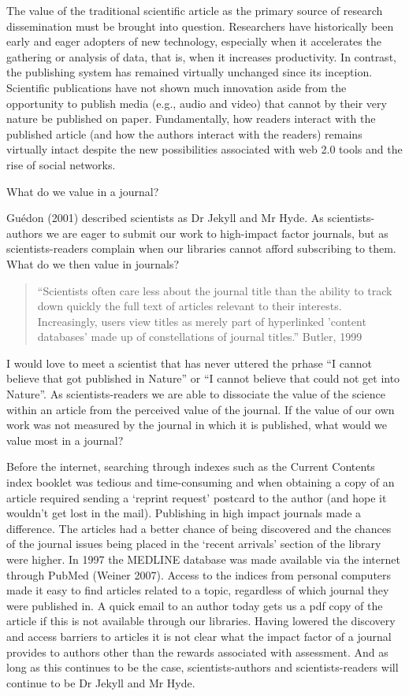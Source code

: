 \documentclass[final,authoryear,3p]{elsarticle-open-drafting}
\begin{document}
The value of the traditional scientific article as the primary source of research dissemination must be brought into question. Researchers have historically been early and eager adopters of new technology, especially when it accelerates the gathering or analysis of data, that is, when it increases productivity. In contrast, the publishing system has remained virtually unchanged since its inception. Scientific publications have not shown much innovation aside from the opportunity to publish media (e.g., audio and video) that cannot by their very nature be published on paper. Fundamentally, how readers interact with the published article (and how the authors interact with the readers) remains virtually intact despite the new possibilities associated with web 2.0 tools and the rise of social networks.

What do we value in a journal?

Guédon (2001) described scientists as Dr Jekyll and Mr Hyde. As scientists-authors we are eager to submit our work to high-impact factor journals, but as scientists-readers complain when our libraries cannot afford subscribing to them. What do we then value in journals?

\begin{quote}
“Scientists often care less about the journal title than the ability to track down quickly the full text of articles relevant to their interests. Increasingly, users view titles as merely part of hyperlinked 'content databases' made up of constellations of journal titles.” Butler, 1999
\end{quote}

I would love to meet a scientist that has never uttered the prhase “I cannot believe that got published in Nature” or “I cannot believe that could not get into Nature”. As scientists-readers we are able to dissociate the value of the science within an article from the perceived value of the journal. If the value of our own work was not measured by the journal in which it is published, what would we value most in a journal?

Before the internet, searching through indexes such as the Current Contents index booklet was tedious and time-consuming and when obtaining a copy of an article required sending a ‘reprint request’ postcard to the author (and hope it wouldn’t get lost in the mail). Publishing in high impact journals made a difference. The articles had a better chance of being discovered and the chances of the journal issues being placed in the ‘recent arrivals’ section of the library were higher. In 1997 the MEDLINE database was made available via the internet through PubMed (Weiner 2007). Access to the indices from personal computers made it easy to find articles related to a topic, regardless of which journal they were published in. A quick email to an author today gets us a pdf copy of the article if this is not available through our libraries. Having lowered the discovery and access barriers to articles it is not clear what the impact factor of a journal provides to authors other than the rewards associated with assessment. And as long as this continues to be the case, scientists-authors and scientists-readers will continue to be Dr Jekyll and Mr Hyde.
\end{document}
